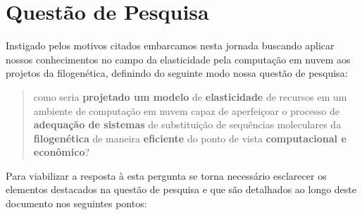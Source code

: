 \documentclass[english,brazilian]{UNISINOSmonografia} %
\begin{document}
\section{Questão de Pesquisa} %


Instigado pelos motivos citados embarcamos nesta jornada buscando aplicar nossos conhecimentos no campo da elasticidade pela computação em nuvem aos projetos da filogenética, definindo do seguinte modo nossa questão de pesquisa:


\begin{quote}
	\large
	como seria \textbf{projetado um modelo} de \textbf{elasticidade} de recursos em um ambiente de computação em nuvem capaz de aperfeiçoar o processo de \textbf{adequação de sistemas} de substituição de sequências moleculares da \textbf{filogenética} de maneira \textbf{eficiente} do ponto de vista \textbf{computacional e econômico}?
	
\end{quote}


Para viabilizar a resposta à esta pergunta se torna necessário esclarecer os elementos destacados na questão de pesquisa e que são detalhados ao longo deste documento nos seguintes pontos:
\end{document}

